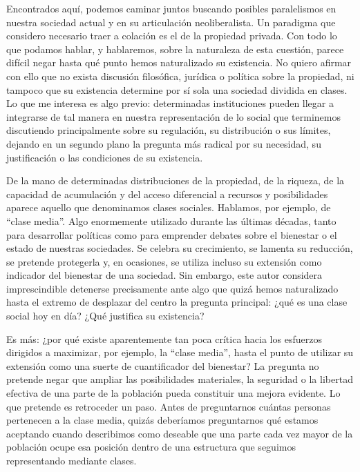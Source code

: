 \documentclass[12pt,a4paper]{article}
\begin{document}
Encontrados aquí, podemos caminar juntos buscando posibles paralelismos en nuestra sociedad actual y en su articulación neoliberalista. Un paradigma que considero necesario traer a colación es el de la propiedad privada. Con todo lo que podamos hablar, y hablaremos, sobre la naturaleza de esta cuestión, parece difícil negar hasta qué punto hemos naturalizado su existencia. No quiero afirmar con ello que no exista discusión filosófica, jurídica o política sobre la propiedad, ni tampoco que su existencia determine por sí sola una sociedad dividida en clases. Lo que me interesa es algo previo: determinadas instituciones pueden llegar a integrarse de tal manera en nuestra representación de lo social que terminemos discutiendo principalmente sobre su regulación, su distribución o sus límites, dejando en un segundo plano la pregunta más radical por su necesidad, su justificación o las condiciones de su existencia.

De la mano de determinadas distribuciones de la propiedad, de la riqueza, de la capacidad de acumulación y del acceso diferencial a recursos y posibilidades aparece aquello que denominamos clases sociales. Hablamos, por ejemplo, de \enquote{clase media}. Algo enormemente utilizado durante las últimas décadas, tanto para desarrollar políticas como para emprender debates sobre el bienestar o el estado de nuestras sociedades. Se celebra su crecimiento, se lamenta su reducción, se pretende protegerla y, en ocasiones, se utiliza incluso su extensión como indicador del bienestar de una sociedad. Sin embargo, este autor considera imprescindible detenerse precisamente ante algo que quizá hemos naturalizado hasta el extremo de desplazar del centro la pregunta principal: ¿qué es una clase social hoy en día? ¿Qué justifica su existencia?

Es más: ¿por qué existe aparentemente tan poca crítica hacia los esfuerzos dirigidos a maximizar, por ejemplo, la \enquote{clase media}, hasta el punto de utilizar su extensión como una suerte de cuantificador del bienestar? La pregunta no pretende negar que ampliar las posibilidades materiales, la seguridad o la libertad efectiva de una parte de la población pueda constituir una mejora evidente. Lo que pretende es retroceder un paso. Antes de preguntarnos cuántas personas pertenecen a la clase media, quizás deberíamos preguntarnos qué estamos aceptando cuando describimos como deseable que una parte cada vez mayor de la población ocupe esa posición dentro de una estructura que seguimos representando mediante clases.
\end{document}
